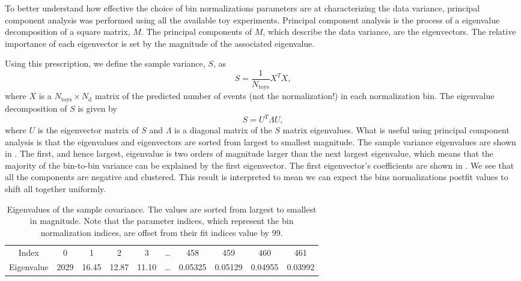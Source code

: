 To better understand how effective the choice of bin normalizations
parameters are at characterizing the data variance, principal component
analysis was performed using all the available toy experiments. Principal
component analysis is the process of a eigenvalue decomposition of
a square matrix, $M$. The principal components of $M$, which describe
the data variance, are the eigenvectors. The relative importance of
each eigenvector is set by the magnitude of the associated eigenvalue.

Using this prescription, we define the sample variance, $S$, as
\[
S=\frac{1}{N_{\text{toys}}}X^{T}X,
\]
where $X$ is a $N_{\text{toys}}\times N_{\text{d}}$ matrix of the
predicted number of events (not the normalization!) in each normalization
bin. The eigenvalue decomposition of $S$ is given by
\[
S=U^{T}\Lambda U,
\]
where $U$ is the eigenvector matrix of $S$ and $\Lambda$ is a diagonal
matrix of the $S$ matrix eigenvalues. What is useful using principal
component analysis is that the eigenvalues and eigenvectors are sorted
from largest to smallest magnitude. The sample variance eigenvalues
are shown in . The first,
and hence largest, eigenvalue is two orders of magnitude larger than
the next largest eigenvalue, which means that the majority of the
bin-to-bin variance can be explained by the first eigenvector. The
first eigenvector's coefficients are shown in .
We see that all the components are negative and clustered. This result
is interpreted to mean we can expect the bins normalizations postfit
values to shift all together uniformly.

\begin{table}
\caption[Eigenvalues of the Sample Covariance]{Eigenvalues of the sample covariance. The values are sorted from largest
to smallest in magnitude. Note that the parameter indices, which represent
the bin normalization indices, are offset from their fit indices value
by 99.\label{tab:Eigenvalues-sample-covariance}}

\begin{centering}
\begin{tabular}{|c||c|c|c|c|c|c|c|c|c|}
\hline 
Index & 0 & 1 & 2 & 3 & \ldots{} & 458 & 459 & 460 & 461\tabularnewline
Eigenvalue & 2029 & 16.45 & 12.87 & 11.10 & \ldots{} & 0.05325 & 0.05129 & 0.04955 & 0.03992\tabularnewline
\hline 
\end{tabular}
\par\end{centering}
\end{table}

